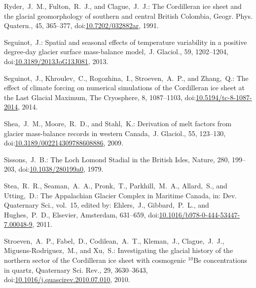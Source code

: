 \documentclass[tc, manuscript]{copernicus}
\begin{document}
\begin{thebibliography}{114}
Ryder,~J.~M., Fulton,~R.~J., and Clague,~J.~J.: The Cordilleran ice sheet and the glacial geomorphology of southern and central British Colombia, G{e}ogr. Phys. Quatern., 45, 365--377,
doi:\href{http://dx.doi.org/10.7202/032882ar}{10.7202/032882ar}, 1991.


Seguinot,~J.: Spatial and seasonal effects of temperature variability in a positive degree-day glacier surface mass-balance model,~J. Glaciol., 59, 1202--1204,
doi:\href{http://dx.doi.org/10.3189/2013JoG13J081}{10.3189/2013JoG13J081}, 2013.


 Seguinot,~J., Khroulev,~C., Rogozhina,~I., Stroeven,~A.~P., and Zhang,~Q.: The effect of climate forcing on numerical simulations of the Cordilleran ice sheet at the Last Glacial Maximum, The Cryosphere, 8, 1087--1103,
doi:\href{http://dx.doi.org/10.5194/tc-8-1087-2014}{10.5194/tc-8-1087-2014}, 2014.


Shea,~J.~M., Moore,~R.~D., and Stahl,~K.: Derivation of melt factors from glacier mass-balance records in western Canada,~J. Glaciol., 55, 123--130,
doi:\href{http://dx.doi.org/10.3189/002214309788608886}{10.3189/002214309788608886}, 2009.


Sissons,~J.~B.: The Loch Lomond Stadial in the British Isles, Nature, 280, 199--203,
doi:\href{http://dx.doi.org/10.1038/280199a0}{10.1038/280199a0}, 1979.


Stea,~R.~R., Seaman,~A.~A., Pronk,~T., Parkhill,~M.~A., Allard,~S., and Utting,~D.: The Appalachian Glacier Complex in Maritime Canada, in:   Dev. Quaternary Sci., vol.~15, edited by: Ehlers,~J., Gibbard,~P.~L., and Hughes,~P.~D., Elsevier, Amsterdam, 631--659,
doi:\href{http://dx.doi.org/10.1016/b978-0-444-53447-7.00048-9}{10.1016/b978-0-444-53447-7.00048-9}, 2011.


Stroeven,~A.~P., Fabel,~D., Codilean,~A.~T., Kleman,~J., Clague,~J.~J., Miguens-Rodriguez,~M., and Xu,~S.: Investigating the glacial history of the northern sector of the Cordilleran ice sheet with cosmogenic $^{10}$Be concentrations in quartz, Quaternary Sci. Rev., 29, 3630--3643,
doi:\href{http://dx.doi.org/10.1016/j.quascirev.2010.07.010}{10.1016/j.quascirev.2010.07.010}, 2010.



\end{thebibliography}
\end{document}

